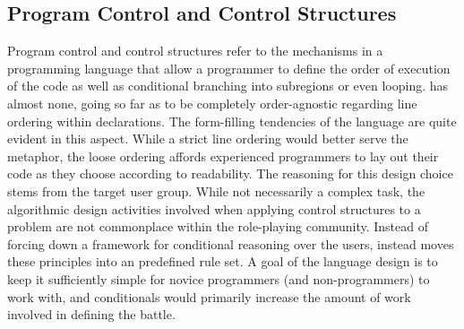 \subsection{Program Control and Control Structures}
Program control and control structures refer to the mechanisms in a programming language that allow a programmer to define the order of execution of the code as well as conditional branching into subregions or even looping. \langname{} has almost none, going so far as to be completely order-agnostic regarding line ordering within declarations. 
The form-filling tendencies of the language are quite evident in this aspect. While a strict line ordering would better serve the metaphor, the loose ordering %
affords experienced programmers to lay out their code as they choose according to readability. %
The reasoning for this design choice stems from the target user group. While not necessarily a complex task, the algorithmic design activities involved when applying control structures to a problem are not commonplace within the role-playing community. Instead of forcing down a framework for conditional reasoning over the users, \langname{} instead moves these principles into an predefined rule set.
A goal of the language design is to keep it sufficiently simple for novice programmers (and non-programmers) to work with, and conditionals would primarily increase the amount of work involved in defining the battle. %
